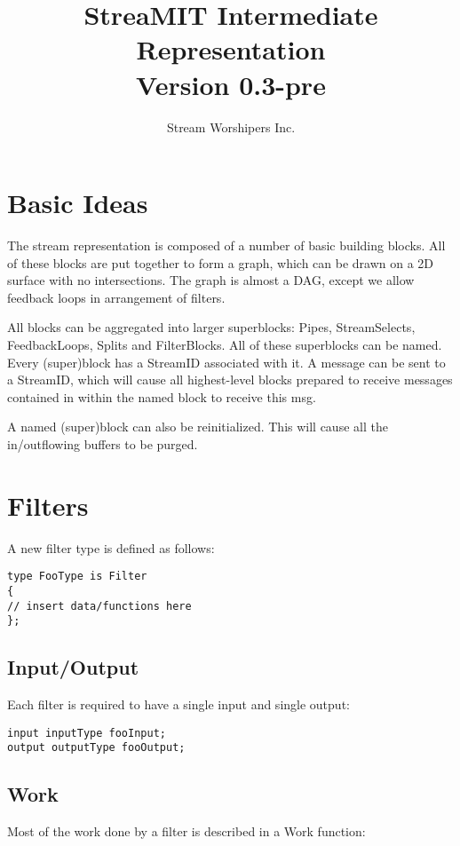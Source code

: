 \documentclass[twocolumn, draft]{article}
\title{StreaMIT Intermediate Representation \\ Version 0.3-pre}
\author{Stream Worshipers Inc.}
\begin{document}
\maketitle

\section{Basic Ideas}

The stream representation is composed of a number of basic building blocks.
All of these blocks are put together to form a graph, which can be drawn
on a 2D surface with no intersections.  The graph is almost a DAG, except
we allow feedback loops in arrangement of filters.

All blocks can be aggregated into larger superblocks:  Pipes, StreamSelects,
FeedbackLoops, Splits and FilterBlocks.  
All of these superblocks can be named.  Every 
(super)block has a StreamID associated with it.  A message can be sent 
to a StreamID, which will cause all highest-level blocks prepared to
receive messages contained in within the named block
to receive this msg.

A named (super)block can also be reinitialized.  This will cause all the 
in/outflowing buffers to be purged.

\section{Filters}
A new filter type is defined as follows:

\begin{verbatim}
type FooType is Filter
{
// insert data/functions here
};
\end{verbatim}

\subsection{Input/Output}

Each filter is required to have a single input and single output:
\begin{verbatim}
input inputType fooInput;
output outputType fooOutput;
\end{verbatim}

\subsection{Work}

Most of the work done by a filter is described in a Work function:
\end{document}
